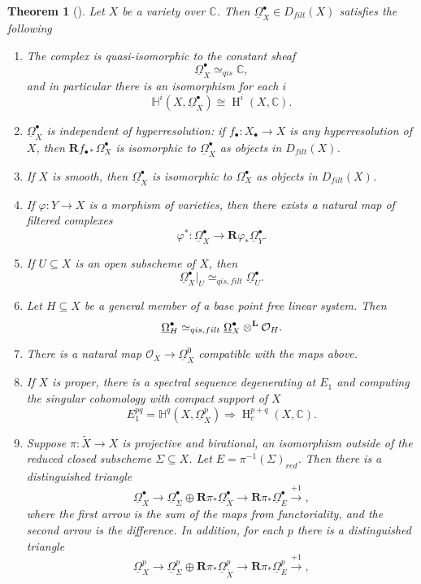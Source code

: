 \documentclass[proquest]{uwthesis}[2014/11/13]
\newtheorem{theorem}{Theorem}[section]
\theoremstyle{definition}
\DeclareMathOperator{\Ho}{H}
\newcommand{\CC}{\mathbb{C}}
\newcommand{\HH}{\mathbb{H}}
\newcommand{\OO}{\mathcal{O}}
\newcommand{\qis}{\simeq_{qis}}
\newcommand{\qisf}{\simeq_{qis,filt}}
\newcommand{\bR}{\textbf{R}}
\newcommand{\otimesL}{\otimes^{\bf L}}
\newcommand{\DB}{\underline{\Omega}}
\begin{document}
\begin{theorem}[{\cite[6.5]{Kollar2013}}]
	\label{thm:omnibus}
	Let $X$ be a variety over $\CC$.
	Then $\DB_X^\bullet \in D_{filt}(X)$ satisfies the following
	\begin{enumerate}
		\item \label{thm:omnibus:qisconst} The complex is quasi-isomorphic to the constant sheaf \[
		\DB_X^\bullet \qis \CC,
		\]
		and in particular there is an isomorphism for each $i$
		\[
		\HH^i(X, \DB_X^\bullet) \cong \Ho^i (X, \CC).
		\]
		\item $\DB_X^\bullet$ is independent of hyperresolution: if $f_\bullet : X_\bullet \rightarrow X$ is any hyperresolution of $X$, then $\bR f_{\bullet *} \Omega_X^\bullet$ is isomorphic to $\DB_X^\bullet$ as objects in $D_{filt}(X)$.
		\item If $X$ is smooth, then $\DB_X^\bullet$ is isomorphic to $\Omega_X^\bullet$ as objects in $D_{filt}(X)$.
		\item
		If $\varphi : Y \rightarrow X$ is a morphism of varieties, then there exists a natural map of filtered complexes
		\[
		\varphi^* : \DB_X^\bullet \rightarrow \bR \varphi_* \DB_Y^\bullet.
		\]
		\item If $U \subseteq X$ is an open subscheme of $X$, then
		\[
		\DB_X^\bullet |_U \qisf \DB_U^\bullet.
		\]
		\item Let $H \subseteq X$ be a general member of a base point free linear system.
		Then
		\[
		\DB_H^\bullet \qisf \DB_X^\bullet \otimesL \OO_H.
		\]
		\item \label{thm:omnibus:natmap} There is a natural map $\OO_X \rightarrow \DB_X^0 $ compatible with the maps above.
		\item \label{thm:omnibus:specseq} If $X$ is proper, there is a spectral sequence degenerating at $E_1$ and computing the singular cohomology with compact support of $X$
		\[
		E_1^{pq} = \HH^q (X, \DB_X^p) \Rightarrow \Ho_c^{p+q} (X, \CC).
		\]
		\item Suppose $\pi : \tilde{X} \rightarrow X$ is projective and birational, an isomorphism outside of the reduced closed subscheme $\Sigma \subseteq X$.
		Let $E = \pi^{-1}(\Sigma)_{red}$.
		Then there is a distinguished triangle
		\[
		\DB_X^\bullet \rightarrow \DB_\Sigma^\bullet \oplus \bR \pi_* \DB_{\tilde{X}}^\bullet \rightarrow \bR \pi_* \DB_E^\bullet \xrightarrow{+1},
		\]
		where the first arrow is the sum of the maps from functoriality, and the second arrow is the difference.
		In addition, for each $p$ there is a distinguished triangle
		\[
		\DB_X^p \rightarrow \DB_\Sigma^p \oplus \bR \pi_* \DB_{\tilde{X}}^p \rightarrow \bR \pi_* \DB_E^p \xrightarrow{+1},
		\]
	\end{enumerate}
\end{theorem}
\end{document}
